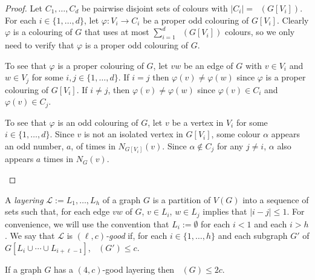 \documentclass{patmorin}
\DeclareMathOperator{\odd}{\chi_o}
\begin{document}
\begin{proof}
  Let $C_1,\ldots,C_d$ be pairwise disjoint sets of colours with $|C_i|=\odd(G[V_i])$.  For each $i\in\{1,\ldots,d\}$, let $\varphi:V_i\to C_i$ be a proper odd colouring of $G[V_i]$.  Clearly $\varphi$ is a colouring of $G$ that uses at most $\sum_{i=1}^d \odd(G[V_i])$ colours, so we only need to verify that $\varphi$ is a proper odd colouring of $G$.
  \begin{compactitem}
    \item To see that $\varphi$ is a proper colouring of $G$, let $vw$ be an edge of $G$ with $v\in V_i$ and $w\in V_j$ for some $i,j\in\{1,\ldots,d\}$. If $i=j$ then $\varphi(v)\neq\varphi(w)$ since $\varphi$ is a proper colouring of $G[V_i]$.  If $i\neq j$, then $\varphi(v)\neq\varphi(w)$ since $\varphi(v)\in C_i$ and $\varphi(v)\in C_j$.

    \item To see that $\varphi$ is an odd colouring of $G$, let $v$ be a vertex in $V_i$ for some $i\in\{1,\ldots,d\}$.   Since $v$ is not an isolated vertex in $G[V_i]$, some colour $\alpha$ appears an odd number, $a$, of times in $N_{G[V_i]}(v)$.  Since $\alpha\not\in C_j$ for any $j\neq i$, $\alpha$ also appears $a$ times in $N_G(v)$. \qedhere
  \end{compactitem}
\end{proof}

A \emph{layering} $\mathcal{L}:=L_1,\ldots,L_h$ of a graph $G$ is a partition of $V(G)$ into a sequence of sets such that, for each edge $vw$ of $G$, $v\in L_i$, $w\in L_j$ implies that $|i-j|\le 1$.  For convenience, we will use the convention that $L_i:=\emptyset$ for each $i < 1$ and each $i> h$.  We say that $\mathcal{L}$ is \emph{$(\ell,c)$-good} if, for each $i\in\{1,\ldots,h\}$ and each subgraph $G'$ of $G[L_i\cup\cdots\cup L_{i+\ell-1}]$, $\odd(G')\le c$.


\begin{lem}\label{four_good}
  If a graph $G$ has a $(4,c)$-good layering then $\odd(G)\le 2c$.
\end{lem}
\end{document}
